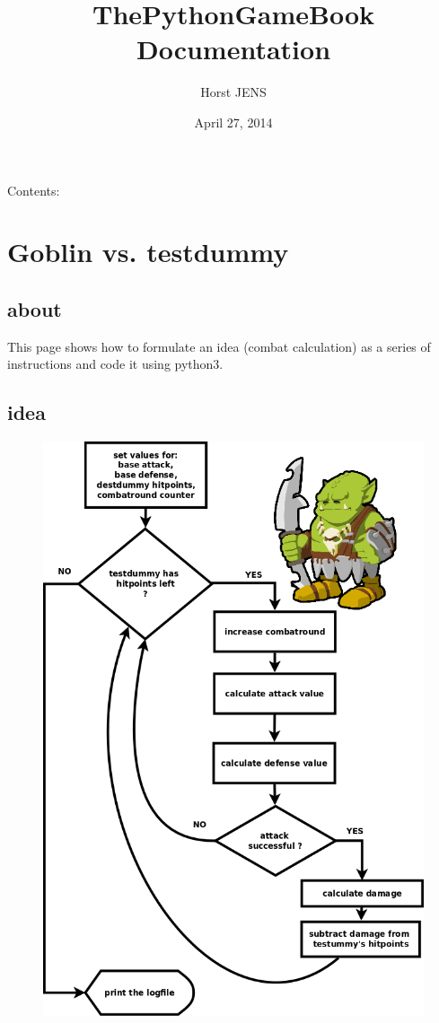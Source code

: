 \documentclass[letterpaper,10pt,english]{sphinxmanual}
\title{ThePythonGameBook Documentation}
\date{April 27, 2014}
\author{Horst JENS}
\begin{document}
\maketitle
\tableofcontents
{}\label{index::doc}


Contents:


\chapter{Goblin vs. testdummy}
\label{goblindice001:welcome-to-thepythongamebook-s-documentation}\label{goblindice001::doc}\label{goblindice001:goblin-vs-testdummy}

\section{about}
\label{goblindice001:about}
This page shows how to formulate an idea (combat calculation) as a series of instructions and code it using python3.


\section{idea}
\label{goblindice001:idea}\begin{figure}[htbp]\begin{flushright}

\includegraphics{goblindice001.png}
\end{flushright}\end{figure}
\end{document}
